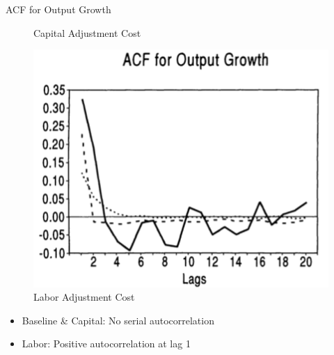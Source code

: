 \documentclass[10pt]{beamer}
\begin{document}
\begin{frame}{ACF for Output Growth}
\begin{minipage}{0.33\textwidth}
\begin{figure}
            \caption{Capital Adjustment Cost}
        \end{figure}
    \end{minipage}%
    \begin{minipage}{0.33\textwidth}
        \begin{figure}
            \centering
            \includegraphics[width=\linewidth]{figures/L_ACF.png}
            \caption{Labor Adjustment Cost}
        \end{figure}
    \end{minipage}

    \begin{itemize}
        \item Baseline \& Capital: No serial autocorrelation
        \item Labor: Positive autocorrelation at lag 1
    \end{itemize}

\end{frame}
\end{document}

